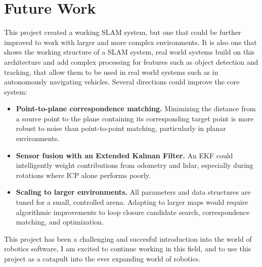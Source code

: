 \documentclass[12pt]{report}
\begin{document}
\chapter{Future Work}

This project created a working SLAM system, but one that could be further improved to work with larger and more complex environments.
It is also one that shows the working structure of a SLAM system, real world systems build on this architecture and add complex processing 
for features such as object detection and tracking, that allow them to be used in real world systems such as in autonomously navigating vehicles. 
Several directions could improve the core system:

\begin{itemize}
    \item \textbf{Point-to-plane correspondence matching.}
          Minimizing the distance from a source point to the plane containing its corresponding target
          point is more robust to noise than point-to-point matching, particularly in planar
          environments. 

    \item \textbf{Sensor fusion with an Extended Kalman Filter.}
          An EKF could intelligently weight contributions from odometry and lidar, especially during
          rotations where ICP alone performs poorly.

    \item \textbf{Scaling to larger environments.}
          All parameters and data structures are tuned for a small, controlled arena.
          Adapting to larger maps would require algorithmic improvements to loop closure candidate
          search, correspondence matching, and optimization.
\end{itemize}

This project has been a challenging and succesful introduction into the world of robotics software, I am excited to continue 
working in this field, and to use this project as a catapult into the ever expanding world of robotics.
\end{document}

